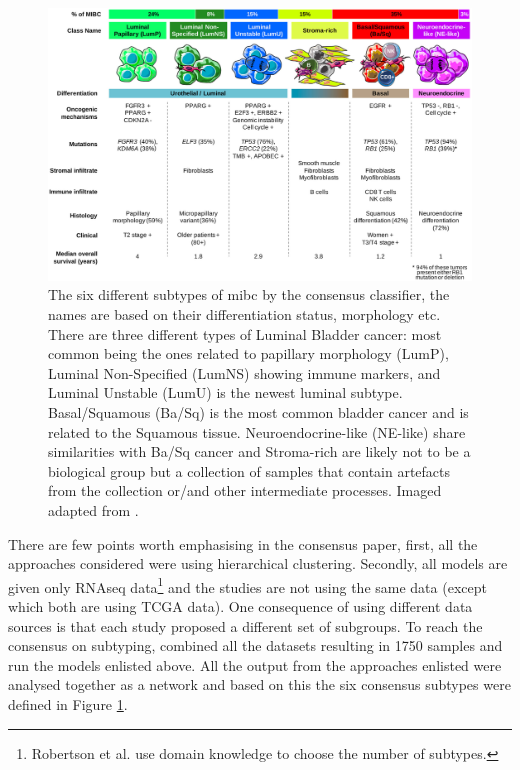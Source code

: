 \begin{figure}[!htb]                                  
    \centering\includegraphics[width=1.0\textwidth,height=1.0\textheight,keepaspectratio]{Images/TCGA/2020_consensus_subtypes.jpg}
      \caption{The six different subtypes of \acrfull{mibc} by the consensus classifier\cite{Kamoun2020-tj}, the names are based on their differentiation status, morphology etc. There are three different types of Luminal Bladder cancer: most common being the ones related to papillary morphology (LumP), Luminal Non-Specified (LumNS) showing immune markers, and Luminal Unstable (LumU) is the newest luminal subtype. Basal/Squamous (Ba/Sq) is the most common bladder cancer and is related to the Squamous tissue. Neuroendocrine-like (NE-like) share similarities with Ba/Sq cancer and Stroma-rich are likely not to be a biological group but a collection of samples that contain artefacts from the collection or/and other intermediate processes. Imaged adapted from \cite{Kamoun2020-tj}.
      }
      \label{fig:2020_consens}
  \end{figure}
  \FloatBarrier

There are few points worth emphasising in the consensus paper, first, all the approaches\cite{Mo2018-rl, Damrauer2014-tc, Choi2014-ed, Marzouka2018-ge, Rebouissou2014-ep,Robertson2017-mg} considered were using hierarchical clustering. Secondly, all models are given only RNAseq data\footnote{Robertson et al. use domain knowledge to choose the number of subtypes.} and the studies are not using the same data (except \cite{Robertson2017-mg, Mo2018-rl} which both are using TCGA data). One consequence of using different data sources is that each study proposed a different set of subgroups. To reach the consensus on subtyping, \citet{Kamoun2020-tj} combined all the datasets resulting in 1750 samples and run the models enlisted above. All the output from the approaches enlisted were analysed together as a network and based on this the six consensus subtypes were defined in Figure \ref{fig:2020_consens}.

